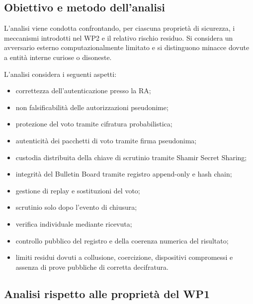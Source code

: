 \documentclass[12pt,a4paper]{article}
\begin{document}
\subsection{Obiettivo e metodo dell'analisi}

L'analisi viene condotta confrontando, per ciascuna propriet\`a di sicurezza, i meccanismi introdotti nel WP2 e il relativo rischio residuo. Si considera un avversario esterno computazionalmente limitato e si distinguono minacce dovute a entit\`a interne curiose o disoneste.

L'analisi considera i seguenti aspetti:
\begin{itemize}
\item correttezza dell'autenticazione presso la RA;
\item non falsificabilit\`a delle autorizzazioni pseudonime;
\item protezione del voto tramite cifratura probabilistica;
\item autenticit\`a dei pacchetti di voto tramite firma pseudonima;
\item custodia distribuita della chiave di scrutinio tramite Shamir Secret Sharing;
\item integrit\`a del Bulletin Board tramite registro append-only e hash chain;
\item gestione di replay e sostituzioni del voto;
\item scrutinio solo dopo l'evento di chiusura;
\item verifica individuale mediante ricevuta;
\item controllo pubblico del registro e della coerenza numerica del risultato;
\item limiti residui dovuti a collusione, coercizione, dispositivi compromessi e assenza di prove pubbliche di corretta decifratura.
\end{itemize}

\subsection{Analisi rispetto alle propriet\`a del WP1}
\end{document}

